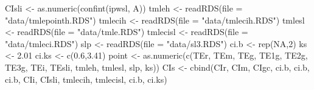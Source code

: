 \documentclass[
]{book}
\newenvironment{Shaded}{\begin{snugshade}}{\end{snugshade}}
\newcommand{\AttributeTok}[1]{\textcolor[rgb]{0.77,0.63,0.00}{#1}}
\newcommand{\ConstantTok}[1]{\textcolor[rgb]{0.00,0.00,0.00}{#1}}
\newcommand{\DecValTok}[1]{\textcolor[rgb]{0.00,0.00,0.81}{#1}}
\newcommand{\FloatTok}[1]{\textcolor[rgb]{0.00,0.00,0.81}{#1}}
\newcommand{\FunctionTok}[1]{\textcolor[rgb]{0.00,0.00,0.00}{#1}}
\newcommand{\NormalTok}[1]{#1}
\newcommand{\OtherTok}[1]{\textcolor[rgb]{0.56,0.35,0.01}{#1}}
\newcommand{\StringTok}[1]{\textcolor[rgb]{0.31,0.60,0.02}{#1}}
\begin{document}
\begin{Shaded}
\begin{Highlighting}[]
\NormalTok{CIsli }\OtherTok{\textless{}{-}} \FunctionTok{as.numeric}\NormalTok{(}\FunctionTok{confint}\NormalTok{(ipwsl, }\StringTok{\textquotesingle{}A\textquotesingle{}}\NormalTok{))}
\NormalTok{tmleh }\OtherTok{\textless{}{-}} \FunctionTok{readRDS}\NormalTok{(}\AttributeTok{file =} \StringTok{"data/tmlepointh.RDS"}\NormalTok{)}
\NormalTok{tmlecih }\OtherTok{\textless{}{-}} \FunctionTok{readRDS}\NormalTok{(}\AttributeTok{file =} \StringTok{"data/tmlecih.RDS"}\NormalTok{)}
\NormalTok{tmlesl }\OtherTok{\textless{}{-}} \FunctionTok{readRDS}\NormalTok{(}\AttributeTok{file =} \StringTok{"data/tmle.RDS"}\NormalTok{)}
\NormalTok{tmlecisl }\OtherTok{\textless{}{-}} \FunctionTok{readRDS}\NormalTok{(}\AttributeTok{file =} \StringTok{"data/tmleci.RDS"}\NormalTok{)}
\NormalTok{slp }\OtherTok{\textless{}{-}} \FunctionTok{readRDS}\NormalTok{(}\AttributeTok{file =} \StringTok{"data/sl3.RDS"}\NormalTok{)}
\NormalTok{ci.b }\OtherTok{\textless{}{-}} \FunctionTok{rep}\NormalTok{(}\ConstantTok{NA}\NormalTok{,}\DecValTok{2}\NormalTok{)}
\NormalTok{ks }\OtherTok{\textless{}{-}} \FloatTok{2.01}
\NormalTok{ci.ks }\OtherTok{\textless{}{-}} \FunctionTok{c}\NormalTok{(}\FloatTok{0.6}\NormalTok{,}\FloatTok{3.41}\NormalTok{)}
\NormalTok{point }\OtherTok{\textless{}{-}} \FunctionTok{as.numeric}\NormalTok{(}\FunctionTok{c}\NormalTok{(TEr, TEm, TEg, TE1g, TE2g,  }
\NormalTok{                      TE3g, TEi, TEsli, tmleh, }
\NormalTok{                      tmlesl, slp, ks))}
\NormalTok{CIs }\OtherTok{\textless{}{-}} \FunctionTok{cbind}\NormalTok{(CIr, CIm, CIgc, ci.b, ci.b, ci.b, }
\NormalTok{             CIi, CIsli, tmlecih, tmlecisl, }
\NormalTok{             ci.b, ci.ks)    }
\end{Highlighting}
\end{Shaded}
\end{document}
